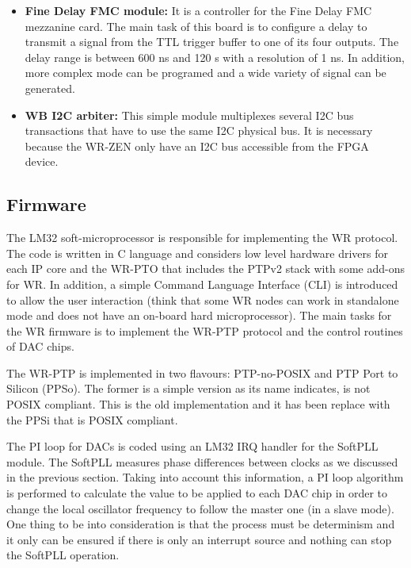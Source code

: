 \documentclass[review]{elsarticle}
\newcommand{\klyonenote}[1]{\todo[bordercolor=red, backgroundcolor=yellow, noline]{#1}}
\begin{document}
\begin{itemize}
{	%
	}
	\item{\textbf{Fine Delay FMC module:} It is a controller for the Fine Delay FMC mezzanine card. The main task of this board is to configure a delay to transmit a signal from the TTL trigger buffer to one of its four outputs. The delay range is between 600 ns and 120 s with a resolution of 1 ns. In addition, more complex mode can be programed and a wide variety of signal can be generated.}
	\item{\textbf{WB I2C arbiter:} This simple module multiplexes several I2C bus transactions that have to use the same I2C physical bus. It is necessary because the WR-ZEN only have an I2C bus accessible from the FPGA device.}
\end{itemize}

\subsection{Firmware}

The LM32 soft-microprocessor is responsible for implementing the WR protocol. The code is written in C language and considers low level hardware drivers for each IP core and the WR-PTO that includes the PTPv2 stack with some add-ons for WR. In addition, a simple Command Language Interface (CLI) is introduced to allow the user interaction (think that some WR nodes can work in standalone mode and does not have an on-board hard microprocessor). The main tasks for the WR firmware is to implement the WR-PTP protocol and the control routines of DAC chips. 

\klyonenote{What more information can we add at this point?}
The WR-PTP is implemented in two flavours: PTP-no-POSIX and PTP Port to Silicon (PPSo). The former is a simple version as its name indicates, is not POSIX compliant. This is the old implementation and it has been replace with the PPSi that is POSIX compliant.

The PI loop for DACs is coded using an LM32 IRQ handler for the SoftPLL module. The SoftPLL measures phase differences between clocks as we discussed in the previous section. Taking into account this information, a PI loop algorithm is performed to calculate the value to be applied to each DAC chip in order to change the local oscillator frequency to follow the master one (in a slave mode). One thing to be into consideration is that the process must be determinism and it only can be ensured if there is only an interrupt source and nothing can stop the SoftPLL operation.
\end{document}
